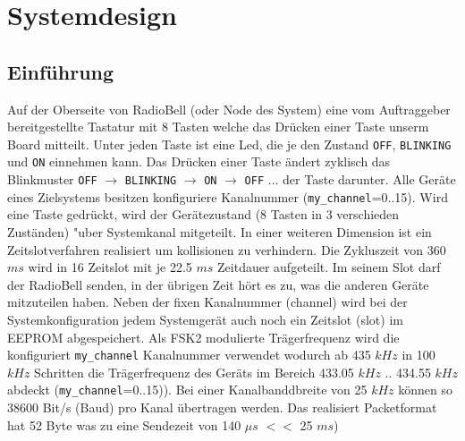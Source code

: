 \section{Systemdesign}
\subsection{Einführung}
Auf der Oberseite von RadioBell (oder Node des System) eine vom Auftraggeber bereitgestellte Tastatur mit 8 Tasten welche das Drücken einer Taste unserm Board mitteilt. Unter jeden Taste ist eine Led, die je den Zustand \texttt{OFF}, \texttt{BLINKING} und \texttt{ON} einnehmen kann. Das Drücken einer Taste ändert zyklisch das Blinkmuster \texttt{OFF} $\rightarrow$ \texttt{BLINKING}  $\rightarrow$ \texttt{ON} $\rightarrow$ \texttt{OFF} ...  der Taste darunter. Alle Geräte eines Zielsystems besitzen konfiguriere Kanalnummer (\verb|my_channel|=0..15). Wird eine Taste gedrückt, wird der Gerätezustand (8 Tasten in 3 verschieden Zuständen) "uber Systemkanal mitgeteilt. In einer weiteren Dimension ist ein Zeitslotverfahren realisiert um kollisionen zu verhindern. Die Zykluszeit von 360 $ms$ wird in 16 Zeitslot mit je 22.5 $ms$ Zeitdauer aufgeteilt. Im seinem Slot darf der RadioBell  senden, in der übrigen Zeit h\"ort es zu, was die anderen Ger\"ate mitzuteilen haben. Neben der fixen Kanalnummer (channel) wird bei der Systemkonfiguration jedem Systemgerät auch noch ein Zeitslot (slot) im EEPROM abgespeichert. Als FSK2 modulierte Trägerfrequenz wird die konfiguriert \verb|my_channel| Kanalnummer verwendet wodurch ab 435 $kHz$ in 100 $kHz$ Schritten die Trägerfrequenz des Geräts im Bereich 433.05 $kHz$ .. 434.55 $kHz$ abdeckt (\verb|my_channel|=0..15)). Bei einer Kanalbanddbreite von 25 $kHz$ können so 38600 Bit/s (Baud) pro Kanal übertragen werden. Das realisiert Packetformat hat 52 Byte was zu eine Sendezeit von 140 $\mu s$  $<<$ 25 $ms$) 

